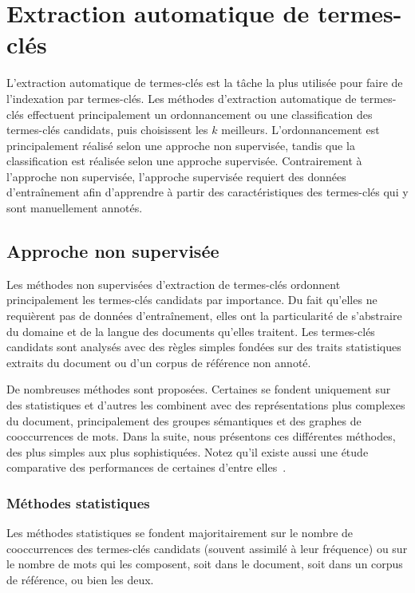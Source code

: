 
  \section{Extraction automatique de termes-clés}
  \label{sec:main-state_of_the_art-automatic_keyphrase_extraction}
    L'extraction automatique de termes-clés est la tâche la plus utilisée pour
    faire de l'indexation par termes-clés. Les méthodes d'extraction automatique
    de termes-clés effectuent principalement un ordonnancement ou une
    classification des termes-clés candidats, puis choisissent les $k$
    meilleurs. L'ordonnancement est principalement réalisé selon une approche
    non supervisée, tandis que la classification est réalisée selon une approche
    supervisée. Contrairement à l'approche non supervisée, l'approche supervisée
    requiert des données d'entraînement afin d'apprendre à partir des
    caractéristiques des termes-clés qui y sont manuellement annotés.

    \subsection{Approche non supervisée}
    \label{subsec:main-state_of_the_art-automatic_keyphrase_extraction-unsupervised_keyphrase_extraction}
      Les méthodes non supervisées d'extraction de termes-clés ordonnent
      principalement les termes-clés candidats par importance. Du fait qu'elles
      ne requièrent pas de données d'entraînement, elles ont la particularité de
      s'abstraire du domaine et de la langue des documents qu'elles traitent.
      Les termes-clés candidats sont analysés avec des règles simples fondées
      sur des traits statistiques extraits du document ou d'un corpus de
      référence non annoté.

      De nombreuses méthodes sont proposées. Certaines se fondent uniquement
      sur des statistiques et d'autres les combinent avec des représentations
      plus complexes du document, principalement des groupes sémantiques et des
      graphes de cooccurrences de mots. Dans la suite, nous présentons ces
      différentes méthodes, des plus simples aux plus sophistiquées. Notez qu'il
      existe aussi une étude comparative des performances de certaines d'entre
      elles~\cite{hassan2010conundrums}.

      \subsubsection{Méthodes statistiques}
      \label{subsubsec:main-state_of_the_art-automatic_keyphrase_extraction-unsupervised_keyphrase_extraction-statistical_approaches}
        Les méthodes statistiques se fondent majoritairement sur le nombre de
        cooccurrences des termes-clés candidats (souvent assimilé à leur
        fréquence) ou sur le nombre de mots qui les composent, soit dans le
        document, soit dans un corpus de référence, ou bien les deux.

